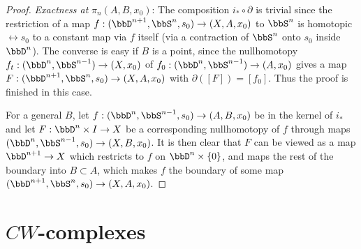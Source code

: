 \begin{proof}
    \emph{Exactness at} $\pi_n(A,B,x_0)$: The composition $i_\ast \circ \partial$ is trivial since the restriction of a map $f:(\bbD^{n+1},\bbS^n,s_0)\to (X,A,x_0)$ to $\bbS^n$ is homotopic $\rel s_0$ to a constant map via $f$ itself (via a contraction of $\bbS^n$ onto $s_0$ inside $\bbD^n$). The converse is easy if $B$ is a point, since the nullhomotopy $f_t:(\bbD^n,\bbS^{n-1})\to (X,x_0)$ of $f_0:(\bbD^n,\bbS^{n-1})\to (A,x_0)$ gives a map $F:(\bbD^{n+1},\bbS^n,s_0)\to (X,A,x_0)$ with $\partial([F])=[f_0]$. Thus the proof is finished in this case. 
    
    For a general $B$, let $f:(\bbD^{n},\bbS^{n-1},s_0)\to (A,B,x_0)$ be in the kernel of $i_\ast$ and let $F:\bbD^n\times I\to X$ be a corresponding nullhomotopy of $f$ through maps $(\bbD^n,\bbS^{n-1},s_0)\to (X,B,x_0)$. It is then clear that $F$ can be viewed as a map $\bbD^{n+1}\to X$ which restricts to $f$ on $\bbD^n\times \{0\}$, and maps the rest of the boundary into $B\subset A$, which makes $f$ the boundary of some map $(\bbD^{n+1},\bbS^n,s_0)\to (X,A,x_0)$.
\end{proof}



\section{\texorpdfstring{$CW$}{CW}-complexes}

